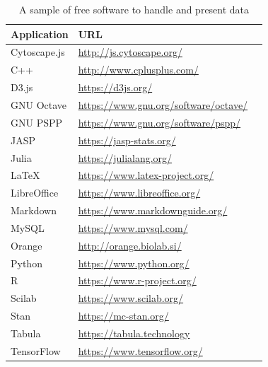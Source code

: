 \documentclass[a4paper]{exam}
\newcommand{\ra}[1]{\renewcommand{\arraystretch}{#1}}
\theoremstyle{plain}
\begin{document}
\begingroup
\fontsize{8pt}{8pt}\selectfont
\begin{table}\centering
  \ra{1.3}
  \begin{tabular}{llc} \toprule
  \cmidrule{1-2} 
  Application   & URL \\ \midrule
  Cytoscape.js  & \url{http://js.cytoscape.org/}\\
  C++           & \url{http://www.cplusplus.com/}\\
  D3.js         & \url{https://d3js.org/}\\
  GNU Octave    & \url{https://www.gnu.org/software/octave/}\\
  GNU PSPP      & \url{https://www.gnu.org/software/pspp/}\\
  JASP          & \url{https://jasp-stats.org/}\\
  Julia         & \url{https://julialang.org/}\\
  \LaTeX        & \url{https://www.latex-project.org/}\\
  LibreOffice   & \url{https://www.libreoffice.org/}\\
  Markdown      & \url{https://www.markdownguide.org/}\\
  MySQL         & \url{https://www.mysql.com/}\\
  Orange        & \url{http://orange.biolab.si/}\\
  Python        & \url{https://www.python.org/}\\
  R             & \url{https://www.r-project.org/}\\
  Scilab        & \url{https://www.scilab.org/}\\
  Stan          & \url{https://mc-stan.org/}\\
  Tabula        & \url{https://tabula.technology}\\
  TensorFlow    & \url{https://www.tensorflow.org/}\\
  \bottomrule
  \end{tabular}
  \caption{A sample of free software to handle and present data}
  \label{tab.free.soft}
\end{table}
\endgroup
\end{document}
